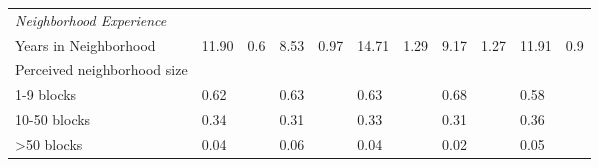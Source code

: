 \begin{sidewaystable}[ht]
\begin{tabular}{lR{.4in}R{.4in}R{.4in}R{.4in}R{.4in}R{.4in}R{.4in}R{.4in}R{.4in}R{.4in}}
  \emph{Neighborhood Experience}\\Years in Neighborhood & 11.90 & 0.6 & 8.53 & 0.97 & 14.71 & 1.29 & 9.17 & 1.27 & 11.91 & 0.9 \\ 
  Perceived neighborhood size\\1-9 blocks &  0.62 &  & 0.63 &  & 0.63 &  & 0.68 &  & 0.58 &  \\ 
  10-50 blocks &  0.34 &  & 0.31 &  & 0.33 &  & 0.31 &  & 0.36 &  \\ 
  >50 blocks &  0.04 &  & 0.06 &  & 0.04 &  & 0.02 &  & 0.05 &  \\ 
   \bottomrule
\end{tabular}
\end{sidewaystable}
